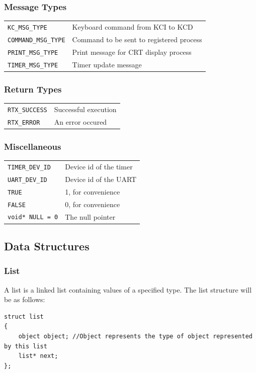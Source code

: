 \documentclass[titlepage]{article}
\begin{document}
\subsubsection{Message Types}
\begin{tabular}{ll}
\verb!KC_MSG_TYPE! & Keyboard command from KCI to KCD \\
\verb!COMMAND_MSG_TYPE! & Command to be sent to registered process \\
\verb!PRINT_MSG_TYPE! & Print message for CRT display process \\
\verb!TIMER_MSG_TYPE! & Timer update message \\
\end{tabular}
\subsubsection{Return Types}
\begin{tabular}{ll}
\verb!RTX_SUCCESS! & Successful execution \\
\verb!RTX_ERROR! & An error occured \\
\end{tabular}
\subsubsection{Miscellaneous}
\begin{tabular}{ll}
\verb!TIMER_DEV_ID! & Device id of the timer \\
\verb!UART_DEV_ID! & Device id of the UART \\
\verb!TRUE! & 1, for convenience \\
\verb!FALSE! & 0, for convenience \\
\verb!void* NULL = 0! & The null pointer \\
\end{tabular}

\subsection{Data Structures}
\subsubsection{List}
A list is a linked list containing values of a specified type.  The list
structure will be as follows:\\
\begin{verbatim}
struct list
{
    object object; //Object represents the type of object represented by this list
    list* next;
};
\end{verbatim}
\end{document}
